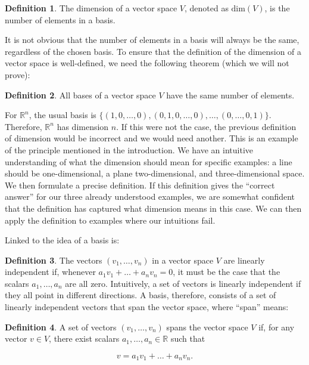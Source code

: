 \documentclass[
]{book}
\theoremstyle{definition}
\newtheorem{definition}{Definition}[chapter]
\theoremstyle{definition}
\theoremstyle{definition}
\theoremstyle{definition}
\theoremstyle{remark}
\begin{document}
\begin{definition}
The dimension of a vector space \(V\), denoted as \(\text{dim}(V)\), is the number of elements in a basis.
\end{definition}

It is not obvious that the number of elements in a basis will always be the same, regardless of the chosen basis. To ensure that the definition of the dimension of a vector space is well-defined, we need the following theorem (which we will not prove):

\begin{definition}
All bases of a vector space \(V\) have the same number of elements.
\end{definition}

For \(\mathbb{R}^n\), the usual basis is \(\{(1, 0, \dots, 0), (0, 1, 0, \dots, 0), \dots, (0, \dots, 0, 1)\}\). Therefore, \(\mathbb{R}^n\) has dimension \(n\). If this were not the case, the previous definition of dimension would be incorrect and we would need another. This is an example of the principle mentioned in the introduction. We have an intuitive understanding of what the dimension should mean for specific examples: a line should be one-dimensional, a plane two-dimensional, and three-dimensional space. We then formulate a precise definition. If this definition gives the ``correct answer'' for our three already understood examples, we are somewhat confident that the definition has captured what dimension means in this case. We can then apply the definition to examples where our intuitions fail.

Linked to the idea of a basis is:

\begin{definition}
The vectors \((v_1, \dots, v_n)\) in a vector space \(V\) are linearly independent if, whenever \(a_1v_1 + \dots + a_nv_n = 0\), it must be the case that the scalars \(a_1, \dots, a_n\) are all zero. Intuitively, a set of vectors is linearly independent if they all point in different directions. A basis, therefore, consists of a set of linearly independent vectors that span the vector space, where ``span'' means:
\end{definition}

\begin{definition}
A set of vectors \((v_1, \dots, v_n)\) spans the vector space \(V\) if, for any vector \(v \in V\), there exist scalars \(a_1, \dots, a_n \in \mathbb{R}\) such that

\[
v = a_1v_1 + \dots + a_nv_n.
\]
\end{definition}
\end{document}
